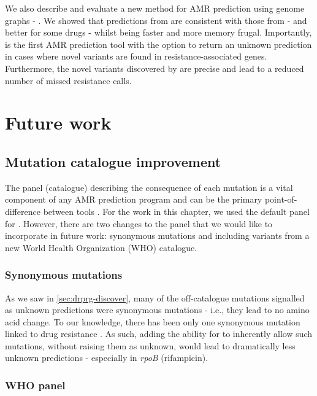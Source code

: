 We also describe and evaluate a new method for AMR prediction using genome graphs - \drprg{}. We showed that predictions from \drprg{} are consistent with those from \mykrobe{} - and better for some drugs - whilst being faster and more memory frugal. Importantly, \drprg{} is the first \mtb{} AMR prediction tool with the option to return an unknown prediction in cases where novel variants are found in resistance-associated genes. Furthermore, the novel variants discovered by \drprg{} are precise and lead to a reduced number of missed resistance calls.

\section{Future work}

\subsection{Mutation catalogue improvement}

The panel (catalogue) describing the consequence of each mutation is a vital component of any AMR prediction program and can be the primary point-of-difference between tools \cite{hunt2019}. For the work in this chapter, we used the default \mykrobe{} panel for \drprg{}. However, there are two changes to the \drprg{} panel that we would like to incorporate in future work: synonymous mutations and including variants from a new World Health Organization (WHO) catalogue.

\subsubsection{Synonymous mutations}

As we saw in \autoref{sec:drprg-discover}, many of the off-catalogue mutations signalled as unknown predictions were synonymous mutations - i.e., they lead to no amino acid change. To our knowledge, there has been only one synonymous mutation linked to \mtb{} drug resistance \cite{Ando2014}. As such, adding the ability for \drprg{} to inherently allow such mutations, without raising them as unknown, would lead to dramatically less unknown predictions - especially in \textit{rpoB} (rifampicin).

\subsubsection{WHO panel}

